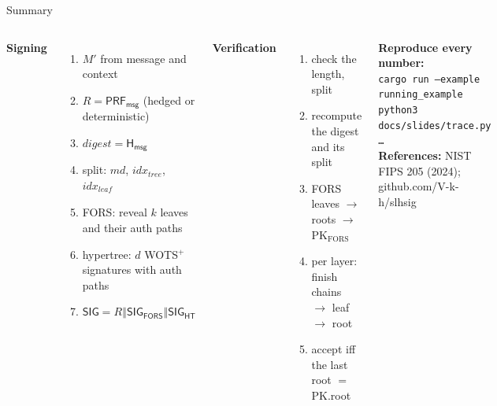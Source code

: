 \documentclass[aspectratio=169,11pt]{beamer}
\newcommand{\cat}{\mathbin{\Vert}}
\begin{document}
\begin{frame}{Summary}
  \begin{columns}[T]
    \textbf{Signing}
    \begin{enumerate}\small
      \item $M'$ from message and context
      \item $R = \mathsf{PRF_{msg}}$ (hedged or deterministic)
      \item $\mathit{digest} = \mathsf{H_{msg}}$
      \item split: $\mathit{md}$, $\mathit{idx}_{\mathit{tree}}$, $\mathit{idx}_{\mathit{leaf}}$
      \item FORS: reveal $k$ leaves and their auth paths
      \item hypertree: $d$ WOTS$^+$ signatures with auth paths
      \item $\mathsf{SIG} = R \cat \mathsf{SIG_{FORS}} \cat \mathsf{SIG_{HT}}$
    \end{enumerate}
    \textbf{Verification}
    \begin{enumerate}\small
      \item check the length, split
      \item recompute the digest and its split
      \item FORS leaves $\to$ roots $\to$ PK$_{\text{FORS}}$
      \item per layer: finish chains $\to$ leaf $\to$ root
      \item accept iff the last root $=$ PK.root
    \end{enumerate}
    \vspace{3mm}
    \footnotesize
    \textbf{Reproduce every number:}\\
    \texttt{cargo run --example running\_example}\\
    \texttt{python3 docs/slides/trace.py \ldots}\\[2mm]
    \textbf{References:} NIST FIPS 205 (2024); github.com/V-k-h/slhsig
  \end{columns}
\end{frame}
\end{document}
